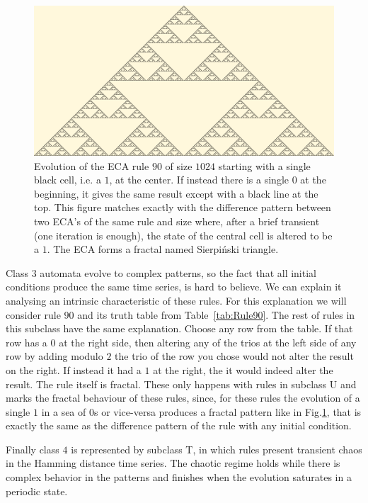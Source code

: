 \begin{figure}
    \centering
    \includegraphics[width=\linewidth]{Images/P4/Sierpinski.png}
    \caption{Evolution of the ECA rule $90$ of size $1024$ starting with a single black cell, i.e. a $1$, at the center. If instead there is a single $0$ at the beginning, it gives the same result except with a black line at the top. This figure matches exactly with the difference pattern between two ECA's of the same rule and size where, after a brief transient (one iteration is enough), the state of the central cell is altered to be a $1$. The ECA forms a fractal named Sierpiński triangle.}
    \label{fig:Rule90}
\end{figure}




Class $3$ automata evolve to complex patterns, so the fact that all initial conditions produce the same time series, is hard to believe. We can explain it analysing an intrinsic characteristic of these rules. For this explanation we will consider rule $90$ and its truth table from Table~\ref{tab:Rule90}. The rest of rules in this subclass have the same explanation. Choose any row from the table. If that row has a $0$ at the right side, then altering any of the trios at the left side of any row by adding modulo $2$ the trio of the row you chose would not alter the result on the right. If instead it had a $1$ at the right, the it would indeed alter the result. The rule itself is fractal. These only happens with rules in subclass U and marks the fractal behaviour of these rules, since, for these rules the evolution of a single $1$ in a sea of $0$s or vice-versa produces a fractal pattern like in Fig.\ref{fig:Rule90}, that is exactly the same as the difference pattern of the rule with any initial condition.

Finally class $4$ is represented by subclass T, in which rules present transient chaos in the Hamming distance time series. The chaotic regime holds while there is complex behavior in the patterns and finishes when the evolution saturates in a periodic state.



